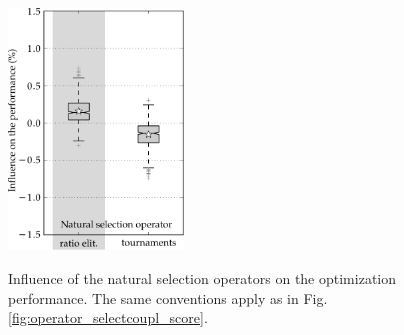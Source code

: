 \documentclass{ametsoc}
\begin{document}
\begin{figure}[t]
	\begin{center}
		\noindent\includegraphics[width=11pc,angle=0]{fig14.pdf}\\
	\end{center}
	\caption{Influence of the natural selection operators on the optimization performance. The same conventions apply as in Fig. \ref{fig:operator_selectcoupl_score}.}
	\label{fig:operator_selectnat_score}
\end{figure}
\end{document}
